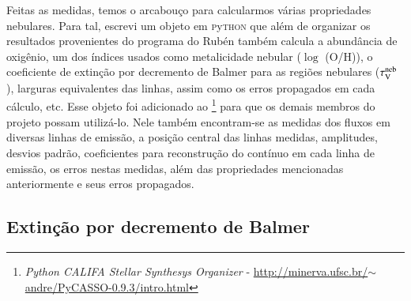 Feitas as medidas, temos o arcabouço para calcularmos várias propriedades nebulares. Para tal,
escrevi um objeto em \textsc{p}y\textsc{thon} que além de organizar os resultados provenientes do
programa do Rubén também calcula a abundância de oxigênio, um dos índices usados como metalicidade
nebular ($\log$ (O/H)), o coeficiente de extinção por decremento de Balmer para as regiões
nebulares ($\tau_{\mathrm{V}}^{\mathrm{neb}}$), larguras equivalentes das linhas, assim como os erros propagados em cada
cálculo, etc. Esse objeto foi adicionado ao \pycasso\footnote{
	{\em Python CALIFA Stellar Synthesys Organizer} -
\href{
	http://minerva.ufsc.br/~andre/PyCASSO-0.9.3/intro.html
}{
	http://minerva.ufsc.br/$\sim$andre/PyCASSO-0.9.3/intro.html}
}
\citep{CidFernandes.etal.2013a} para que os demais membros do projeto possam utilizá-lo. Nele também
encontram-se as medidas dos fluxos em diversas linhas de emissão, a posição central das linhas
medidas, amplitudes, desvios padrão, coeficientes para reconstrução do contínuo em cada linha de
emissão, os erros nestas medidas, além das propriedades mencionadas anteriormente e seus erros
propagados.

\subsection{Extinção por decremento de Balmer}
\label{sec:emline:datacube:tauvneb}

